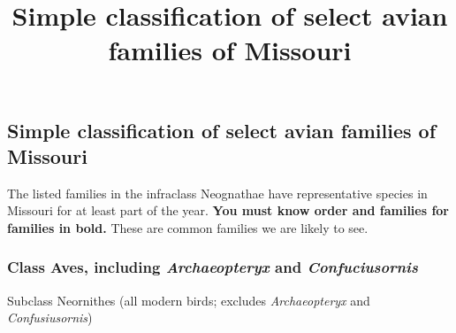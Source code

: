 \documentclass[10pt]{article}
\title{Simple classification of select avian families of Missouri}
\date{}                                           %
\newlength\onelength
\begin{document}
\thispagestyle{plain}

\subsection*{Simple classification of select avian families of Missouri}

The listed families in the infraclass Neognathae have representative species in Missouri for at least part of the year. \textbf{You must know order and families for families in bold.} These are common families we are likely to see.

\subsubsection*{Class Aves, including \textit{Archaeopteryx} and \textit{Confuciusornis}}

Subclass Neornithes (all modern birds; excludes \textit{Archaeopteryx} and \textit{Confusiusornis})
\end{document}
